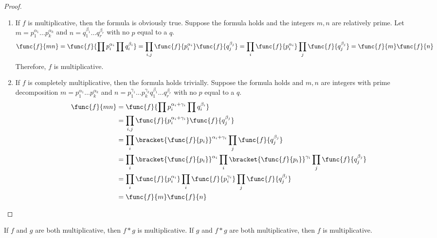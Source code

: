 \begin{proof}
    \
    \begin{enumerate}
        \item If \(f\) is multiplicative, then the formula is obviously true. Suppose the formula holds and the integers \(m,n\) are relatively prime. Let \(m = p_1^{\alpha_1} \dots p_k^{\alpha_k}\) and \(n = q_1^{\beta_1} \dots q_r^{\beta_r}\) with no \(p\) equal to a \(q\).
        \begin{equation*}
            \func{f}{mn} = \func{f}{\prod p_i^{\alpha_i} \prod q_i^{\beta_i}} = \prod_{i,j} \func{f}{p_i^{\alpha_i}} \func{f}{q_j^{\beta_j}} = \prod_i \func{f}{p_i^{\alpha_i }} \prod_j \func{f}{q_j^{\beta_j}} = \func{f}{m} \func{f}{n}
        \end{equation*}
        Therefore, \(f\) is multiplicative.
        \item If \(f\) is completely multiplicative, then the formula holds trivially. Suppose the formula holds and \(m,n\) are integers with prime decomposition \(m = p_1^{\alpha_1} \dots p_k^{\alpha_k}\) and \(n = p_1^{\gamma_1} \dots p_k^{\gamma_k} q_1^{\beta_1} \dots q_r^{\beta_r}\) with no \(p\) equal to a \(q\).
        \begin{align*}
            \func{f}{mn} &= \func{f}{\prod p_i^{\alpha_i + \gamma_i} \prod q_i^{\beta_i}}\\
            &= \prod_{i,j} \func{f}{p_i^{\alpha_i + \gamma_i}} \func{f}{q_j^{\beta_j}}\\
            &= \prod_i \bracket{\func{f}{p_i}}^{\alpha_i + \gamma_i} \prod_j \func{f}{q_j^{\beta_j}} \\
            &= \prod_i \bracket{\func{f}{p_i}}^{\alpha_i} \prod_i \bracket{\func{f}{p_i}}^{\gamma_i} \prod_j \func{f}{q_j^{\beta_j}} \\
            &= \prod_i \func{f}{p_i^{\alpha_i}} \prod_i \func{f}{p_i^{\gamma_i}} \prod_j \func{f}{q_j^{\beta_j}}\\
            &= \func{f}{m} \func{f}{n}
        \end{align*}
        
    \end{enumerate}
\end{proof}

\begin{theorem}
    If \(f\) and \(g\) are both multiplicative, then \(f \ast g\) is multiplicative. If \(g\) and \(f \ast g\) are both multiplicative, then \(f\) is multiplicative.
\end{theorem}

